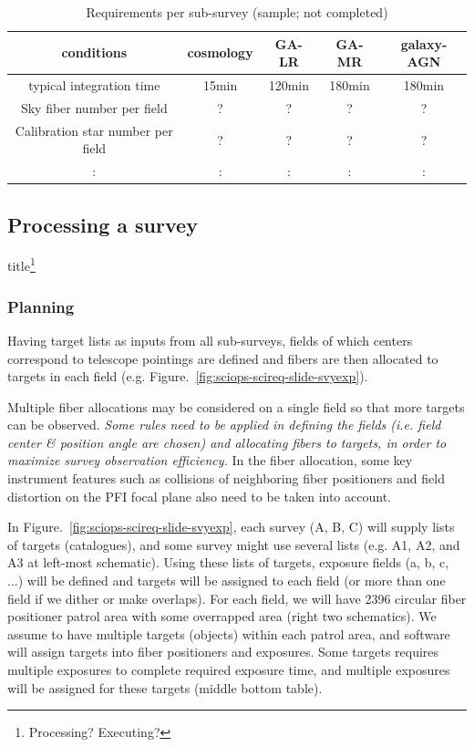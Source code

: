 \documentclass[a4paper,notitlepage]{article}
\begin{document}
\begin{table}[htb]
\caption{Requirements per sub-survey (sample; not completed)}
\label{tab:sciops-scireq-subsvy}
\begin{center}
\begin{tabular}{c|c|c|c|c}
conditions & cosmology & GA-LR & GA-MR & galaxy-AGN \\
\hline
\hline
typical integration time & 15min & 120min & 180min & 180min \\
\hline
Sky fiber number per field & ? & ? & ? & ? \\
\hline
Calibration star number per field & ? & ? & ? & ? \\
\hline
 : & : & : & : & : \\
\end{tabular}
\end{center}
\end{table}

\subsection{Processing a survey}
\label{sec:background:survey}

title\footnote{Processing? Executing? }


\subsubsection{Planning}
\label{sec:background:survey:planning}

Having target lists as inputs from all sub-surveys, 
fields of which centers correspond to telescope pointings are defined 
and fibers are then allocated to targets in each field
(e.g. Figure.~\ref{fig:sciops-scireq-slide-svyexp}). 

Multiple fiber
allocations may be considered on a single field so that more targets can
be observed. {\it Some rules need to be applied in defining the fields
(i.e. field center \& position angle are chosen) and allocating fibers
to targets, in order to maximize survey observation efficiency.}  
In the fiber allocation, some key instrument features such as collisions of
neighboring fiber positioners and field distortion on the PFI focal
plane also need to be taken into account.


In Figure.~\ref{fig:sciops-scireq-slide-svyexp}, 
each survey (A, B, C) will supply lists of targets (catalogues), 
and some survey might use several lists (e.g. A1, A2, and A3 at left-most 
schematic). 
Using these lists of targets, exposure fields (a, b, c, ...) will be defined 
and targets will be assigned to each field (or more than one field if we 
dither or make overlaps). 
For each field, we will have 2396 circular fiber positioner patrol area 
with some overrapped area (right two schematics). 
We assume to have multiple targets (objects) within each patrol area, 
and software will assign targets into fiber positioners and exposures. 
Some targets requires multiple exposures to complete required exposure time, 
and multiple exposures will be assigned for these targets
(middle bottom table). 
\end{document}

